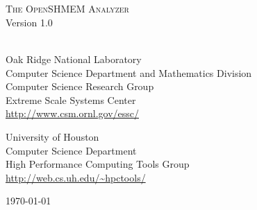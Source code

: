 \begin{titlepage}
  \begin{center}

    \vspace{1.0in} ~ \\

    \HRule \\[0.1in]
    {\LARGE \textsc{The OpenSHMEM Analyzer}} \\
    \vspace{0.2in}
    {\LARGE Version 1.0} \\
    \HRule \\[0.5in]

    \vspace{0.5in}

    Oak Ridge National Laboratory \\
    Computer Science Department and Mathematics Division \\
    Computer Science Research Group \\
    Extreme Scale Systems Center \\
    \vspace{0.1in}
    {\small \url{http://www.csm.ornl.gov/essc/}}

    \vspace{0.4in}

    University of Houston \\
    Computer Science Department \\
    High Performance Computing Tools Group \\
    \vspace{0.1in}
    {\small \url{http://web.cs.uh.edu/~hpctools/}}

    \vspace{1.0in}

    \today

  \end{center}
\end{titlepage}
